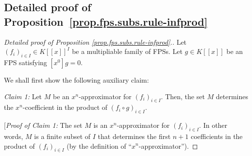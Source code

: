 \subsection{Detailed proof of Proposition~\ref{prop.fps.subs.rule-infprod}}

\begin{proof}[Detailed proof of Proposition \ref{prop.fps.subs.rule-infprod}.]
\leanok
Let $\left(
f_{i}\right)  _{i\in I}\in K\left[  \left[  x\right]  \right]  ^{I}$ be a
multipliable family of FPSs. Let $g\in K\left[  \left[  x\right]  \right]  $
be an FPS satisfying $\left[  x^{0}\right]  g=0$.

We shall first show the following auxiliary claim:

\textit{Claim 1:} Let $M$ be an $x^{n}$-approximator for $\left(
f_{i}\right)  _{i\in I}$. Then, the set $M$ determines the $x^{n}$-coefficient
in the product of $\left(  f_{i}\circ g\right)  _{i\in I}$.

[\textit{Proof of Claim 1:} The set $M$ is an $x^{n}$-approximator for
$\left(  f_{i}\right)  _{i\in I}$. In other words, $M$ is a finite subset of
$I$ that determines the first $n+1$ coefficients in the product of $\left(
f_{i}\right)  _{i\in I}$ (by the definition of ``$x^{n}$-approximator'').


\end{proof}
